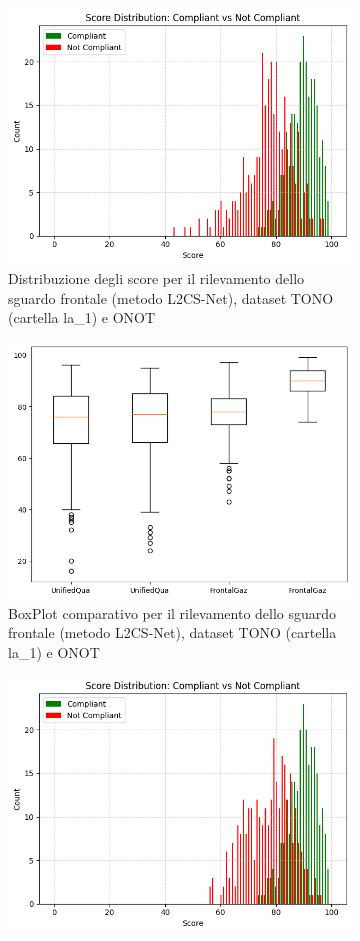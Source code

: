 \documentclass[12pt,a4paper,openright,twoside]{book}
\begin{document}
\begin{figure}[htbp]
    \centering
    \begin{subfigure}{0.49\textwidth}
        \centering
        \includegraphics[width=.7\linewidth]{figures/score-distribution-tono-onot-l1-frontal-gaze-l2cs.png}
        \caption{Distribuzione degli score per il rilevamento dello sguardo frontale (metodo L2CS-Net), dataset TONO (cartella la\_1) e ONOT}
        \label{fig:score_distribution_tono_onot_l1_frontal_gaze_l2cs}
    \end{subfigure}
    \hfill
    \begin{subfigure}{0.49\textwidth}
        \centering
        \includegraphics[width=.7\linewidth]{figures/box-plot-tono-onot-l1-frontal-gaze-l2cs.png}
        \caption{BoxPlot comparativo per il rilevamento dello sguardo frontale (metodo L2CS-Net), dataset TONO (cartella la\_1) e ONOT}
        \label{fig:box_plot_tono_onot_l1_frontal_gaze_l2cs}
    \end{subfigure}
    \begin{subfigure}{0.49\textwidth}
        \centering
        \includegraphics[width=.7\linewidth]{figures/score-distribution-tono-onot-l2-frontal-gaze-l2cs.png}

\end{subfigure}
\end{figure}
\end{document}
